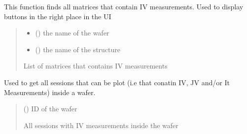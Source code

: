 \documentclass[letterpaper,10pt,english]{sphinxmanual}
\begin{document}

\begin{fulllineitems}
\label{\detokenize{getter:getter.get_matrices_with_I}}
\pysigstartsignatures
{}
\pysigstopsignatures
\sphinxAtStartPar
This function finds all matrices that contain I\sphinxhyphen{}V measurements. Used to display buttons in the right place in the UI
\begin{quote}\begin{description}
\begin{itemize}
\item {} 
\sphinxAtStartPar
{} () \textendash{} the name of the wafer

\item {} 
\sphinxAtStartPar
{} () \textendash{} the name of the structure

\end{itemize}

\sphinxAtStartPar
List of matrices that contains I\sphinxhyphen{}V measurements

\end{description}\end{quote}

\end{fulllineitems}


\begin{fulllineitems}
\label{\detokenize{getter:getter.get_plot_sessions}}
\pysigstartsignatures
{}
\pysigstopsignatures
\sphinxAtStartPar
Used to get all sessions that can be plot (i.e that conatin I\sphinxhyphen{}V, J\sphinxhyphen{}V and/or It Measurements) inside a wafer.
\begin{quote}\begin{description}
\sphinxAtStartPar
{} () \textendash{} ID of the wafer

\sphinxAtStartPar
All sessions with I\sphinxhyphen{}V measurements inside the wafer

\end{description}\end{quote}

\end{fulllineitems}
\end{document}
